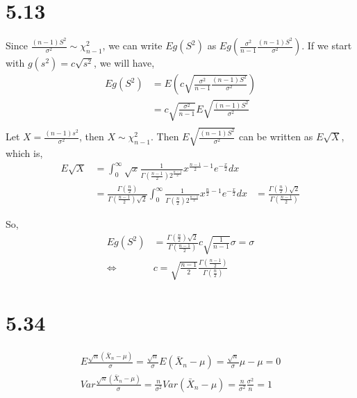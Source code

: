 \documentclass[letterpaper]{article}
\newcommand{\intzi}{\int_0^\infty}
\begin{document}
\section*{5.13}
Since $\frac{(n-1)S^2}{\sigma^2} \sim \chi^2_{n-1}$, we can write $Eg(S^2)$ as $Eg(\frac{\sigma^2}{n-1} \frac{(n-1)S^2}{\sigma^2})$. If we start with $g(s^2) = c\sqrt{s^2}$, we will have,
\begin{align*}
Eg(S^2) & = E(c\sqrt{\frac{\sigma^2}{n-1} \frac{(n-1)S^2}{\sigma^2}}) \\
& = c \sqrt{\frac{\sigma^2}{n-1}} E\sqrt{\frac{(n-1)S^2}{\sigma^2}} \\
\end{align*}
Let $X = \frac{(n-1)s^2}{\sigma^2}$, then $X \sim \chi^2_{n-1}$. Then $E\sqrt{\frac{(n-1)S^2}{\sigma^2}}$ can be written as $E\sqrt{X}$, which is,
\begin{align*}
E\sqrt{X} & = \intzi \sqrt{x} \frac{1}{\Gamma(\frac{n-1}{2})2^{\frac{n-1}{2}}} x^{\frac{n-1}{2} - 1} e^{-\frac{x}{2}} dx \\
& = \frac{\Gamma(\frac{n}{2})}{\Gamma(\frac{n-1}{2}) \sqrt{2}} \intzi \frac{1}{\Gamma(\frac{n}{2}) 2^{\frac{n-1}{2}}} x^{\frac{n}{2} - 1} e^{-\frac{x}{2}} dx 
& = \frac{\Gamma(\frac{n}{2})\sqrt{2}}{\Gamma(\frac{n-1}{2})}
\end{align*}

So,
\begin{align*}
Eg(S^2) & = \frac{\Gamma(\frac{n}{2})\sqrt{2}}{\Gamma(\frac{n-1}{2})} c \sqrt{\frac{1}{n-1}} \sigma = \sigma  \\
\iff & c = \sqrt{\frac{n-1}{2}} \frac{\Gamma(\frac{n-1}{2})}{\Gamma(\frac{n}{2})}
\end{align*}

\section*{5.34}
\begin{align*}
E\frac{\sqrt{n} (\bar X_n - \mu)}{\sigma} = \frac{\sqrt{n}}{\sigma} E(\bar X_n - \mu) = \frac{\sqrt{n}}{\sigma} \mu - \mu = 0 \\
Var \frac{\sqrt{n} (\bar X_n - \mu)}{\sigma} = \frac{n}{\sigma^2} Var (\bar X_n - \mu) = \frac{n}{\sigma^2} \frac{\sigma^2}{n} = 1
\end{align*}
\end{document}
